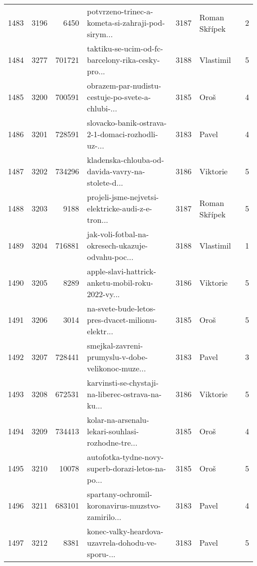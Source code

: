 \begin{tabular}{lrrlrlr}
1483 &       3196 &     6450 &  potvrzeno-trinec-a-kometa-si-zahraji-pod-sirym... &     3187 &                Roman Skřípek &               2 \\
1484 &       3277 &   701721 &  taktiku-se-ucim-od-fc-barcelony-rika-cesky-pro... &     3188 &                    Vlastimil &               5 \\
1485 &       3200 &   700591 &  obrazem-par-nudistu-cestuje-po-svete-a-chlubi-... &     3185 &                         Oroš &               4 \\
1486 &       3201 &   728591 &  slovacko-banik-ostrava-2-1-domaci-rozhodli-uz-... &     3183 &                        Pavel &               4 \\
1487 &       3202 &   734296 &  kladenska-chlouba-od-davida-vavry-na-stolete-d... &     3186 &                     Viktorie &               5 \\
1488 &       3203 &     9188 &  projeli-jsme-nejvetsi-elektricke-audi-z-e-tron... &     3187 &                Roman Skřípek &               5 \\
1489 &       3204 &   716881 &  jak-voli-fotbal-na-okresech-ukazuje-odvahu-poc... &     3188 &                    Vlastimil &               1 \\
1490 &       3205 &     8289 &  apple-slavi-hattrick-anketu-mobil-roku-2022-vy... &     3186 &                     Viktorie &               5 \\
1491 &       3206 &     3014 &  na-svete-bude-letos-pres-dvacet-milionu-elektr... &     3185 &                         Oroš &               5 \\
1492 &       3207 &   728441 &  smejkal-zavreni-prumyslu-v-dobe-velikonoc-muze... &     3183 &                        Pavel &               3 \\
1493 &       3208 &   672531 &  karvinsti-se-chystaji-na-liberec-ostrava-na-ku... &     3186 &                     Viktorie &               5 \\
1494 &       3209 &   734413 &  kolar-na-arsenalu-lekari-souhlasi-rozhodne-tre... &     3185 &                         Oroš &               4 \\
1495 &       3210 &    10078 &  autofotka-tydne-novy-superb-dorazi-letos-na-po... &     3185 &                         Oroš &               5 \\
1496 &       3211 &   683101 &  spartany-ochromil-koronavirus-muzstvo-zamirilo... &     3183 &                        Pavel &               4 \\
1497 &       3212 &     8381 &  konec-valky-heardova-uzavrela-dohodu-ve-sporu-... &     3183 &                        Pavel &               5 \\

\end{tabular}
